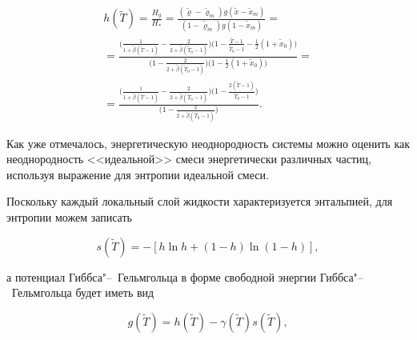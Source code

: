 \begin{multline}\label{lukashev:h}

h(\widetilde{T})=\frac{H_g}{H_*}=

\frac{(\widetilde{\varrho}-\widetilde{\varrho}_m ) g (\widetilde{x}-\widetilde{x}_m )}

{(1-\widetilde{\varrho}_m ) g (1-\widetilde{x}_m)}=

\\

=\frac{\bigl(\frac1{1+\widetilde{\beta}(\widetilde{T}-1)}-\frac2{2+\widetilde{\beta} (\widetilde{T}_0-1)}\bigr)

\bigl(1-\frac{\widetilde{T}-1}{ \widetilde{T}_0-1}-\frac12 (1+\widetilde{x}_0 )\bigr)}

{\bigl(1-\frac2{2+\widetilde{\beta} (\widetilde{T}_0-1)}\bigr) 

\bigl(1-\frac12 (1+\widetilde{x}_0) \bigr)}=

\\

=\frac{\bigl(\frac1{1+\widetilde{\beta}(\widetilde{T}-1)}-\frac2{2+\widetilde{\beta} (\widetilde{T}_0-1)}\bigr)

\bigl(1-\frac{2(\widetilde{T}-1)}{ \widetilde{T}_0-1}\bigr)}{\bigl(1-\frac2{2+\widetilde{\beta} (\widetilde{T}_0-1)}\bigr)}.

\end{multline}



Как уже отмечалось, энергетическую неоднородность системы можно оценить как неоднородность <<идеальной>> смеси энергетически различных частиц, используя выражение для энтропии идеальной смеси. 

Поскольку каждый локальный слой жидкости характеризуется энтальпией,  для энтропии можем записать

\begin{equation}

s(\widetilde{T} )=-[h\ln h+(1-h) \ln(1-h)],\label{lukashev:s}

\end{equation}

а потенциал Гиббса"--~Гельмгольца в форме свободной энергии Гиббса"--~Гельмгольца будет иметь вид

\begin{equation}

g(\widetilde{T})=h(\widetilde{T})-\gamma(\widetilde{T}) s(\widetilde{T}), \label{lukashev:0g}

\end{equation}

